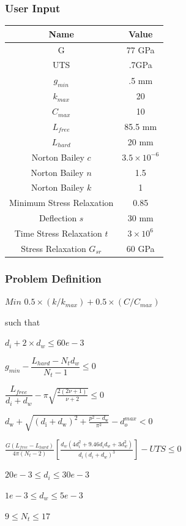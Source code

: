 \documentclass[10pt]{article}
\begin{document}
	\subsubsection{User Input}
	
\begin{center}
	 \begin{tabular}{| c  | c |  }
	 	\hline Name & Value\\
	 	\hline G & 77 GPa \\
		\hline UTS & .7GPa \\
		\hline $g_{min}$ & .5 mm\\ 
	 	\hline $k_{max}$ & 20\\
		\hline $C_{max}$ & 10\\
		\hline $L_{free}$ & 85.5 mm\\
		\hline $L_{hard}$ & 20 mm\\
		\hline Norton Bailey $c$& $ 3.5 \times 10^{-6}$ \\
		\hline Norton Bailey $n$ & 1.5\\
		\hline Norton Bailey $k$ & 1 \\
		\hline Minimum Stress Relaxation & 0.85\\
		\hline Deflection $s$ & 30 mm\\
		\hline Time Stress Relaxation $t$  & $3 \times 10^{6}$\\
		\hline Stress Relaxation $G_{sr}$ & 60 GPa\\
		\hline
	 \end{tabular}
\end{center}

	\subsubsection{Problem Definition}
	
	\centerline{$Min$ \hspace{2 mm}$0.5 \times(k/k_{max}) + 0.5 \times (C/C_{max})$}
	\begin{center}such that \end{center}
	\centerline{$d_{i} + 2 \times d_{w} \leq 60e-3$}
	\centerline{$g_{min} - \dfrac{L_{hard} - N_{t}d_{w}}{N_{t}-1} \leq 0$}
	\centerline{$\dfrac{L_{free}}{d_{i} + d_{w}} - \pi \sqrt{\frac{2(2 \nu + 1)}{\nu + 2}} \leq 0$}
	\centerline{$d_{\text{w}} + \sqrt{(d_{\text{i}} + d_{\text{w}})^{2} + \frac{p^{2} - d_{\text{w}}}{\pi^{2}}} - d_{o}^{max} < 0$}
			
	\centerline{$\frac{G(L_{free} - L_{hard})}{4 \pi (N_{t} - 2) } \left[\frac{d_{w} (4d_{i}^{2} + 9.46d_{i} 
d_{w} + 3 d_{w}^{2})}{d_{i}(d_{i}+d_{w})^{3}}\right] - UTS \leq 0$}
    \centerline{$20e-3 \leq d_{i} \leq 30e-3$}
    \centerline{$1e-3 \leq d_{w} \leq 5e-3$}
    \centerline{$9 \leq N_{t} \leq 17$}
    
\end{document}
